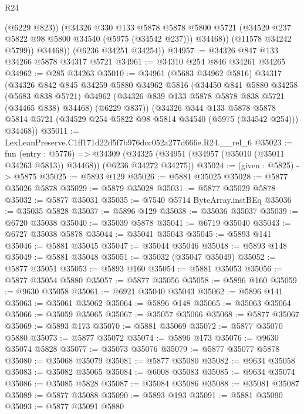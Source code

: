 \begin{lexlean}{R24}
\begin{coremodule}
                (@6229 @823))
              (@34326
                @330
                @133
                @5878
                @5878
                @5800
                @5721
                (@34529 @237 @5822 @98 @5800 @34540 (@5975 (@34542 @237)))
                @34468))
            (@11578 @34242 @5799))
          @34468))
      (@6236 @34251 @34254))
@34957 := @34326 @847 @133 @34266 @5878 @34317 @5721
@34961 := @34310 @254 @846 @34261 @34265
@34962 := @285 @34263
@35010 := @34961
    (@5683 @34962 @5816)
    @34317
    (@34326
      @842
      @845
      @34259
      @5880
      @34962
      @5816
      (@34450
        @841
        @5880
        @34258
        (@5683 @838 @5721)
        @34962
        (@34326 @839 @133 @5878 @5878 @838 @5721 (@34465 @838) @34468)
        (@6229 @837))
      (@34326
        @344
        @133
        @5878
        @5878
        @5814
        @5721
        (@34529 @254 @5822 @98 @5814 @34540 (@5975 (@34542 @254)))
        @34468))
@35011 := LexLeanPreserve.C1ff171d22d5f7b976dcc052a277d666e.R24.__rel_6
@35023 := fun (entry : @5776) =>
  @34309 (@34325 (@34951 (@34957 (@35010 (@35011 @34263 @5813)) @34468)) (@6236 @34272 @34275))
@35024 := (given : @5825) -> @5875
@35025 := @5893 @129
@35026 := @5881 @35025
@35028 := @5877 @35026 @5878
@35029 := @5879 @35028
@35031 := @5877 @35029 @5878
@35032 := @5877 @35031
@35035 := @7540 @5714 ByteArray.instBEq
@35036 := @35035 @5828
@35037 := @5896 @129
@35038 := @35036 @35037
@35039 := @6720 @35038
@35040 := @35039 @5878
@35041 := @6719 @35040
@35043 := @6727 @35038 @5878
@35044 := @35041 @35043
@35045 := @5893 @141
@35046 := @5881 @35045
@35047 := @35044 @35046
@35048 := @5893 @148
@35049 := @5881 @35048
@35051 := @35032 (@35047 @35049)
@35052 := @5877 @35051
@35053 := @5893 @160
@35054 := @5881 @35053
@35056 := @5877 @35054 @5880
@35057 := @5877 @35056
@35058 := @5896 @160
@35059 := @9630 @35058
@35061 := @6921 @35040 @35043
@35062 := @5896 @141
@35063 := @35061 @35062
@35064 := @5896 @148
@35065 := @35063 @35064
@35066 := @35059 @35065
@35067 := @35057 @35066
@35068 := @5877 @35067
@35069 := @5893 @173
@35070 := @5881 @35069
@35072 := @5877 @35070 @5880
@35073 := @5877 @35072
@35074 := @5896 @173
@35076 := @9630 @35074 @5828
@35077 := @35073 @35076
@35079 := @5877 @35077 @5878
@35080 := @35068 @35079
@35081 := @5877 @35080
@35082 := @9634 @35058
@35083 := @35082 @35065
@35084 := @6008 @35083
@35085 := @9634 @35074
@35086 := @35085 @5828
@35087 := @35084 @35086
@35088 := @35081 @35087
@35089 := @5877 @35088
@35090 := @5893 @193
@35091 := @5881 @35090
@35093 := @5877 @35091 @5880

\end{coremodule}
\end{lexlean}
